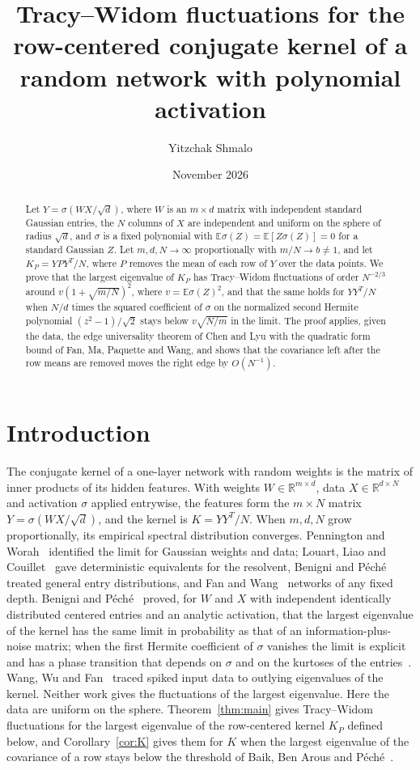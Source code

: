 \documentclass[11pt]{amsart}
\title[Tracy--Widom law for the row-centered conjugate kernel]{Tracy--Widom fluctuations for the row-centered conjugate kernel of a random network with polynomial activation}
\author{Yitzchak Shmalo}
\date{November 2026}
\theoremstyle{remark}
\numberwithin{equation}{section}
\newcommand{\EE}{\mathbb{E}}
\newcommand{\RR}{\mathbb{R}}
\begin{document}
\begin{abstract}
Let $Y=\sigma(WX/\sqrt d)$, where $W$ is an $m\times d$ matrix with independent standard Gaussian entries, the $N$ columns of $X$ are independent and uniform on the sphere of radius $\sqrt d$, and $\sigma$ is a fixed polynomial with $\EE\sigma(Z)=\EE[Z\sigma(Z)]=0$ for a standard Gaussian $Z$. Let $m,d,N\to\infty$ proportionally with $m/N\to b\ne1$, and let $K_P=YPY^{T}/N$, where $P$ removes the mean of each row of $Y$ over the data points. We prove that the largest eigenvalue of $K_P$ has Tracy--Widom fluctuations of order $N^{-2/3}$ around $v(1+\sqrt{m/N})^2$, where $v=\EE\sigma(Z)^2$, and that the same holds for $YY^{T}/N$ when $N/d$ times the squared coefficient of $\sigma$ on the normalized second Hermite polynomial $(z^2-1)/\sqrt2$ stays below $v\sqrt{N/m}$ in the limit. The proof applies, given the data, the edge universality theorem of Chen and Lyu with the quadratic form bound of Fan, Ma, Paquette and Wang, and shows that the covariance left after the row means are removed moves the right edge by $O(N^{-1})$.
\end{abstract}
\maketitle

\section{Introduction}\label{sec:intro}
The conjugate kernel of a one-layer network with random weights is the matrix of inner products of its hidden features. With weights $W\in\RR^{m\times d}$, data $X\in\RR^{d\times N}$ and activation $\sigma$ applied entrywise, the features form the $m\times N$ matrix $Y=\sigma(WX/\sqrt d)$, and the kernel is $K=YY^{T}/N$. When $m,d,N$ grow proportionally, its empirical spectral distribution converges. Pennington and Worah~\cite{PW} identified the limit for Gaussian weights and data; Louart, Liao and Couillet~\cite{LLC} gave deterministic equivalents for the resolvent, Benigni and P\'eché~\cite{BP21} treated general entry distributions, and Fan and Wang~\cite{FW} networks of any fixed depth. Benigni and P\'eché~\cite{BP22} proved, for $W$ and $X$ with independent identically distributed centered entries and an analytic activation, that the largest eigenvalue of the kernel has the same limit in probability as that of an information-plus-noise matrix; when the first Hermite coefficient of $\sigma$ vanishes the limit is explicit and has a phase transition that depends on $\sigma$ and on the kurtoses of the entries~\cite[Theorems~2.4 and~2.5]{BP22}. Wang, Wu and Fan~\cite{WWF} traced spiked input data to outlying eigenvalues of the kernel. Neither work gives the fluctuations of the largest eigenvalue. Here the data are uniform on the sphere. Theorem~\ref{thm:main} gives Tracy--Widom fluctuations for the largest eigenvalue of the row-centered kernel $K_P$ defined below, and Corollary~\ref{cor:K} gives them for $K$ when the largest eigenvalue of the covariance of a row stays below the threshold of Baik, Ben Arous and P\'ech\'e~\cite{BBP}.
\end{document}
